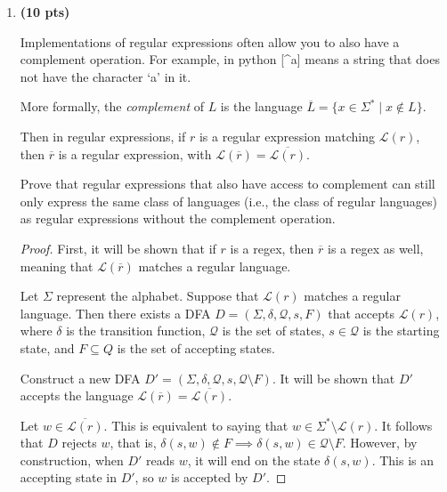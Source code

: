 \documentclass[11pt]{article}
\begin{document}
\begin{enumerate}[label=\textbf{Q\arabic*.}]
\begin{enumerate}[label=\textit{\alph*)}]
\begin{proof}
		Therefore, since this DFA accepts exactly \(L\), it is correct and the proof is done.
	\end{proof}
\end{enumerate}




\item \textbf{(10 pts)}

Implementations of regular expressions often allow you to also have a complement operation. For example, in python [\^{}a] means a string that does not have the character `a' in it. 

More formally,  the \textit{complement} of $L$ is the language $\overline{L} = \{x \in \Sigma^* \mid x \notin L\}$. 

Then in regular expressions, if $r$ is a regular expression matching $\mathcal{L}(r)$, then $\overline{r}$ is a regular expression, with $\mathcal{L}(\overline{r}) = \overline{\mathcal{L}(r)}$. 



Prove that regular expressions that also have access to complement can still only express the same class of languages (i.e., the class of regular languages) as regular expressions without the complement operation. 

\begin{proof}
	First, it will be shown that if \(r\) is a regex, then \(\overline{r}\) is a regex as well, meaning that \(\mathcal{L} (\overline{r})\) matches a regular language.

	Let \(\Sigma\) represent the alphabet. Suppose that \(\mathcal{L} (r)\) matches a regular language. Then there exists a DFA \(D = (\Sigma, \delta, \mathcal{Q}, s, F)\) that accepts \(\mathcal{L} (r)\), where \(\delta\) is the transition function, \(\mathcal{Q}\) is the set of states, \(s \in \mathcal{Q}\) is the starting state, and \(F \subseteq Q\) is the set of accepting states.

	Construct a new DFA \(D' = (\Sigma , \delta , \mathcal{Q} , s, \mathcal{Q} \setminus F)\). It will be shown that \(D'\) accepts the language \(\mathcal{L} (\overline{r}) = \overline{\mathcal{L}(r)}\).

	Let \(w \in \overline{\mathcal{L} (r)}\). This is equivalent to saying that \(w \in \Sigma^* \setminus \mathcal{L} (r)\). It follows that \(D\) rejects \(w\), that is, \(\delta (s,w) \notin F \implies \delta (s,w) \in \mathcal{Q} \setminus F\). However, by construction, when \(D'\) reads \(w\), it will end on the state \(\delta (s,w)\). This is an accepting state in \(D'\), so \(w\) is accepted by \(D'\).


\end{proof}
\end{enumerate}
\end{document}
